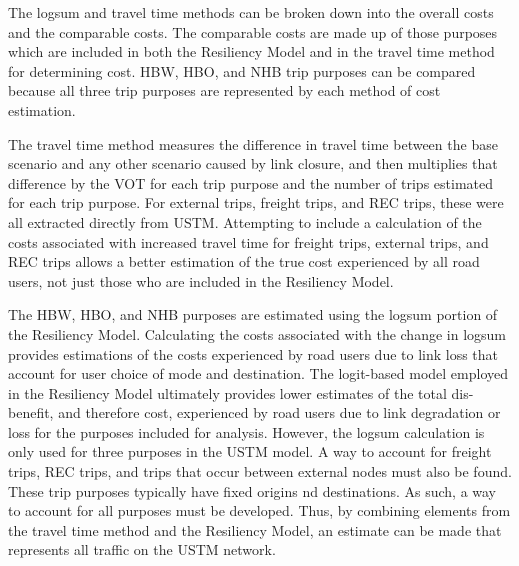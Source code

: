 The logsum and travel time methods can be broken down into the overall costs and the
comparable costs. The comparable costs are made up of those purposes which are
included in both the Resiliency Model and in the travel time method for determining
cost. HBW, HBO, and NHB trip purposes can be compared because all three trip purposes
are represented by each method of cost estimation.

The travel time method measures the difference in travel time between the base
scenario and any other scenario caused by link closure, and then multiplies that
difference by the VOT for each trip purpose and the number of trips estimated for
each trip purpose. For external trips, freight trips, and REC trips, these were all
extracted directly from USTM. Attempting to include a calculation of the costs
associated with increased travel time for freight trips, external trips, and REC
trips allows a better estimation of the true cost experienced by all road users, not
just those who are included in the Resiliency Model.

The HBW, HBO, and NHB purposes are estimated using the logsum portion of the
Resiliency Model. Calculating the costs associated with the change in logsum
provides estimations of the costs experienced by road users due to link loss
that account for user choice of mode and destination. The logit-based model
employed in the Resiliency Model ultimately provides lower estimates of the
total dis-benefit, and therefore cost, experienced by road users due to link
degradation or loss for the purposes included for analysis. However, the
logsum calculation is only used for three purposes in the USTM model. A way to
account for freight trips, REC trips, and trips that occur between external
nodes must also be found. These trip purposes typically have fixed origins
nd destinations. As such, a way to account for all purposes must be developed.
Thus, by combining elements from the travel time method and the Resiliency
Model, an estimate can be made that represents all traffic on the USTM network.

